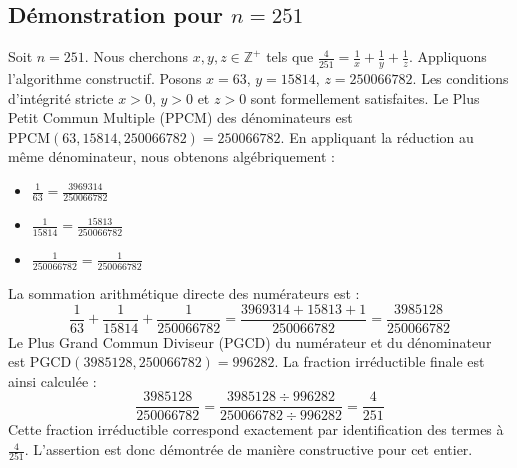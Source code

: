 \documentclass[11pt,a4paper]{article}
\begin{document}
\subsection{Démonstration pour $n = 251$}
Soit $n = 251$. Nous cherchons $x, y, z \in \mathbb{Z}^{+}$ tels que $\frac{4}{251} = \frac{1}{x} + \frac{1}{y} + \frac{1}{z}$.
Appliquons l'algorithme constructif. Posons $x = 63$, $y = 15814$, $z = 250066782$.
Les conditions d'intégrité stricte $x > 0$, $y > 0$ et $z > 0$ sont formellement satisfaites.
Le Plus Petit Commun Multiple (PPCM) des dénominateurs est $\text{PPCM}(63, 15814, 250066782) = 250066782$.
En appliquant la réduction au même dénominateur, nous obtenons algébriquement :
\begin{itemize}
    \item $\frac{1}{63} = \frac{3969314}{250066782}$
    \item $\frac{1}{15814} = \frac{15813}{250066782}$
    \item $\frac{1}{250066782} = \frac{1}{250066782}$
\end{itemize}
La sommation arithmétique directe des numérateurs est :
$$ \frac{1}{63} + \frac{1}{15814} + \frac{1}{250066782} = \frac{3969314 + 15813 + 1}{250066782} = \frac{3985128}{250066782} $$
Le Plus Grand Commun Diviseur (PGCD) du numérateur et du dénominateur est $\text{PGCD}(3985128, 250066782) = 996282$.
La fraction irréductible finale est ainsi calculée :
$$ \frac{3985128}{250066782} = \frac{3985128 \div 996282}{250066782 \div 996282} = \frac{4}{251} $$
Cette fraction irréductible correspond exactement par identification des termes à $\frac{4}{251}$. L'assertion est donc démontrée de manière constructive pour cet entier.
\end{document}
